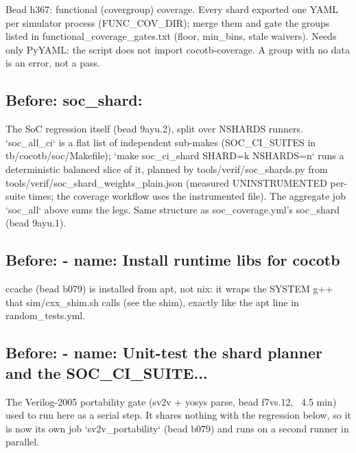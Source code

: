 \begin{record}
\begin{textblock}
Bead h367: functional (covergroup) coverage.  Every shard exported one YAML per simulator
process (FUNC_COV_DIR); merge them and gate the groups listed in functional_coverage_gates.txt
(floor, min_bins, stale waivers).  Needs only PyYAML: the script does not import
cocotb-coverage.  A group with no data is an error, not a pass.
\end{textblock}

\subsection*{Before: soc\_shard:}

\begin{textblock}
The SoC regression itself (bead 9ayu.2), split over NSHARDS runners.  `soc_all_ci` is a flat list
of independent sub-makes (SOC_CI_SUITES in tb/cocotb/soc/Makefile); `make soc_ci_shard SHARD=k
NSHARDS=n` runs a deterministic balanced slice of it, planned by tools/verif/soc_shards.py from
tools/verif/soc_shard_weights_plain.json (measured UNINSTRUMENTED per-suite times; the coverage
workflow uses the instrumented file).  The aggregate job `soc_all` above sums the legs.
Same structure as soc_coverage.yml's soc_shard (bead 9ayu.1).
\end{textblock}

\subsection*{Before: - name: Install runtime libs for cocotb}

\begin{textblock}
ccache (bead b079) is installed from apt, not nix: it wraps the SYSTEM g++ that
sim/cxx_shim.sh calls (see the shim), exactly like the apt line in random_tests.yml.
\end{textblock}

\subsection*{Before: - name: Unit-test the shard planner and the SOC\_CI\_SUITE...}

\begin{textblock}
The Verilog-2005 portability gate (sv2v + yosys parse, bead f7vs.12, ~4.5 min) used to run
here as a serial step.  It shares nothing with the regression below, so it is now its own
job `sv2v_portability` (bead b079) and runs on a second runner in parallel.
\end{textblock}


\end{record}
